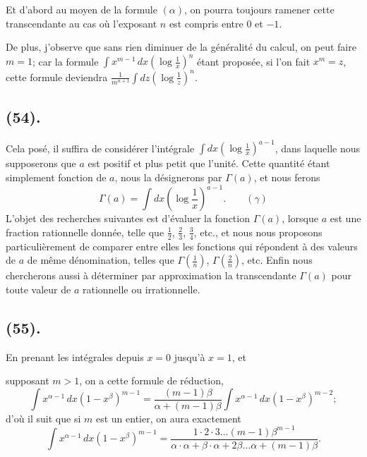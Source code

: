 \documentclass{article}
\begin{document}
Et d'abord au moyen de la formule $(\alpha)$, on pourra toujours ramener cette transcendante au cas où l'exposant $n$ est compris entre 0 et $-1$.

De plus, j'observe que sans rien diminuer de la généralité du calcul, on peut faire $m=1$; car la formule $\displaystyle\int x^{m-1}\,dx\left(\log\frac{1}{x}\right)^{n}$ étant proposée, si l'on fait $x^{m}=z$, cette formule deviendra $\displaystyle\frac{1}{m^{n+1}}\int dz\left(\log\frac{1}{z}\right)^{n}$.

\subsection*{(54).}

Cela posé, il suffira de considérer l'intégrale $\displaystyle\int dx\left(\log\frac{1}{x}\right)^{a-1}$, dans laquelle nous supposerons que $a$ est positif et plus petit que l'unité. Cette quantité étant simplement fonction de $a$, nous la désignerons par $\Gamma(a)$, et nous ferons
\[ \Gamma(a)=\int dx\left(\log\frac{1}{x}\right)^{a-1}.\qquad(\gamma) \]
L'objet des recherches suivantes est d'évaluer la fonction $\Gamma(a)$, lorsque $a$ est une fraction rationnelle donnée, telle que $\frac{1}{2}$, $\frac{2}{3}$, $\frac{3}{4}$, etc., et nous nous proposons particulièrement de comparer entre elles les fonctions qui répondent à des valeurs de $a$ de même dénomination, telles que $\Gamma\left(\frac{1}{n}\right)$, $\Gamma\left(\frac{2}{n}\right)$, etc. Enfin nous chercherons aussi à déterminer par approximation la transcendante $\Gamma(a)$ pour toute valeur de $a$ rationnelle ou irrationnelle.

\subsection*{(55).}

En prenant les intégrales depuis $x=0$ jusqu'à $x=1$, et

supposant $m>1$, on a cette formule de réduction,
\[ \int x^{\alpha-1}\,dx(1-x^{\beta})^{m-1}=\frac{(m-1)\beta}{\alpha+(m-1)\beta}\int x^{\alpha-1}\,dx(1-x^{\beta})^{m-2}; \]
d'où il suit que si $m$ est un entier, on aura exactement
\[ \int x^{\alpha-1}\,dx(1-x^{\beta})^{m-1}=\frac{1\cdot 2\cdot 3\ldots(m-1)\beta^{m-1}}{\alpha\cdot\alpha+\beta\cdot\alpha+2\beta\ldots\alpha+(m-1)\beta}. \]
\end{document}
